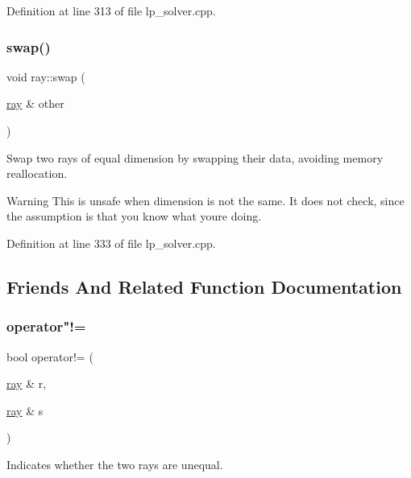 Definition at line 313 of file lp\+\_\+solver.\+cpp.

\mbox{\label{classray_a3f95b591c0b92d2ea8cc04b1c9b0d179}} 
\subsubsection{\texorpdfstring{swap()}{swap()}}
{\footnotesize\ttfamily void ray\+::swap (\begin{DoxyParamCaption}\item[{\hyperlink{classray}{ray} \&}]{other }\end{DoxyParamCaption})}



Swap two rays of equal dimension by swapping their data, avoiding memory reallocation. 

\begin{DoxyWarning}{Warning}
This is unsafe when dimension is not the same. It does not check, since the assumption is that you know what you\textquotesingle{}re doing. 
\end{DoxyWarning}


Definition at line 333 of file lp\+\_\+solver.\+cpp.



\subsection{Friends And Related Function Documentation}
\mbox{\label{classray_a088bbdf2a6fc03509fc660aa3aee110e}} 
\subsubsection{\texorpdfstring{operator"!=}{operator!=}}
{\footnotesize\ttfamily bool operator!= (\begin{DoxyParamCaption}\item[{\hyperlink{classray}{ray} \&}]{r,  }\item[{\hyperlink{classray}{ray} \&}]{s }\end{DoxyParamCaption})\hspace{0.3cm}{\ttfamily [friend]}}



Indicates whether the two rays are unequal. 

